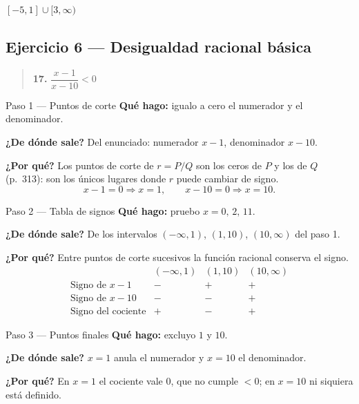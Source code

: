 \documentclass[11pt]{article}
\begin{document}
\begin{resp}
$[-5,1]\cup[3,\infty)$
\end{resp}

\subsection*{Ejercicio 6 — Desigualdad racional básica}

\begin{quote}
\textbf{17.} $\dfrac{x-1}{x-10}<0$
\end{quote}

\begin{paso}{Paso 1 --- Puntos de corte}
\textbf{Qué hago:} igualo a cero el numerador y el denominador.

\textbf{¿De dónde sale?} Del enunciado: numerador $x-1$, denominador $x-10$.

\textbf{¿Por qué?} Los puntos de corte de $r=P/Q$ son los ceros de $P$ y los de $Q$ (p.~313): son los únicos lugares donde $r$ puede cambiar de signo.
\[
x-1=0\Rightarrow x=1,\qquad x-10=0\Rightarrow x=10.
\]
\end{paso}

\begin{paso}{Paso 2 --- Tabla de signos}
\textbf{Qué hago:} pruebo $x=0,\,2,\,11$.

\textbf{¿De dónde sale?} De los intervalos $(-\infty,1)$, $(1,10)$, $(10,\infty)$ del paso 1.

\textbf{¿Por qué?} Entre puntos de corte sucesivos la función racional conserva el signo.
\[
\begin{array}{l|ccc}
 & (-\infty,1) & (1,10) & (10,\infty)\\\hline
\text{Signo de } x-1 & - & + & +\\
\text{Signo de } x-10 & - & - & +\\\hline
\text{Signo del cociente} & + & - & +
\end{array}
\]
\end{paso}

\begin{paso}{Paso 3 --- Puntos finales}
\textbf{Qué hago:} excluyo $1$ y $10$.

\textbf{¿De dónde sale?} $x=1$ anula el numerador y $x=10$ el denominador.

\textbf{¿Por qué?} En $x=1$ el cociente vale $0$, que no cumple $<0$; en $x=10$ ni siquiera está definido.
\end{paso}
\end{document}
